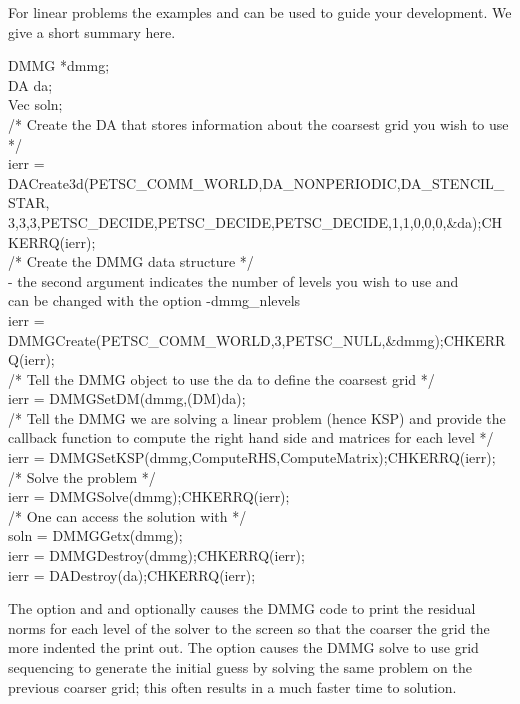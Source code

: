 For linear problems the examples  and  can be used
to guide your development. We give a short summary here.
\begin{tabbing}
  DMMG        *dmmg;\\
  DA          da;\\
  Vec         soln;\\

  /* Create the DA that stores information about the coarsest grid you wish to use */\\
  ierr = DACreate3d(PETSC_COMM_WORLD,DA\_NONPERIODIC,DA_STENCIL_STAR,\\
         3,3,3,PETSC_DECIDE,PETSC_DECIDE,PETSC_DECIDE,1,1,0,0,0,\&da);CHKERRQ(ierr);\\

  /* Create the DMMG data structure */\\
       - the second argument indicates the number of levels you wish to use and \\
         can be changed with the option -dmmg\_nlevels \\
  ierr = DMMGCreate(PETSC_COMM_WORLD,3,PETSC_NULL,\&dmmg);CHKERRQ(ierr);\\

  /*  Tell the DMMG object to use the da to define the coarsest grid */\\
  ierr = DMMGSetDM(dmmg,(DM)da);\\

  /*  Tell the DMMG we are solving a linear problem (hence KSP) and provide the \\
      callback function to compute the right hand side and matrices for each level */\\
  ierr = DMMGSetKSP(dmmg,ComputeRHS,ComputeMatrix);CHKERRQ(ierr);\\

  /*  Solve the problem */\\
  ierr = DMMGSolve(dmmg);CHKERRQ(ierr);\\

  /*  One can access the solution with */\\
  soln = DMMGGetx(dmmg);\\

  ierr = DMMGDestroy(dmmg);CHKERRQ(ierr);\\
  ierr = DADestroy(da);CHKERRQ(ierr);\\
\end{tabbing}
The option   and  and optionally  
 causes the DMMG code to print the residual norms for each level of the solver to the screen so that
the coarser the grid the more indented the print out. The option   causes the 
DMMG solve to use grid sequencing to generate the initial guess by solving the same problem on the previous coarser grid; this often
results in a much faster time to solution.

